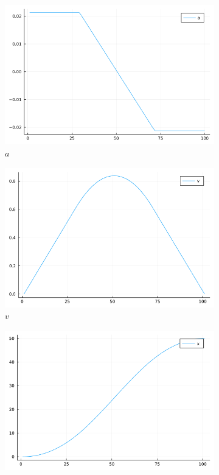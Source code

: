 \documentclass{article}
\newcommand{\1}{\bm 1}
\begin{document}
\begin{figure}
    \centering
    \begin{subfigure}[b]{0.3\textwidth}
        \centering
        \includegraphics[width=\textwidth]{a.png}
        \caption{$a$}
    \end{subfigure}
    \hfill
    \begin{subfigure}[b]{0.3\textwidth}
        \centering
        \includegraphics[width=\textwidth]{v.png}
        \caption{$v$}
    \end{subfigure}
    \hfill
    \begin{subfigure}[b]{0.3\textwidth}
        \centering
        \includegraphics[width=\textwidth]{x.png}

\end{subfigure}
\end{figure}
\end{document}
